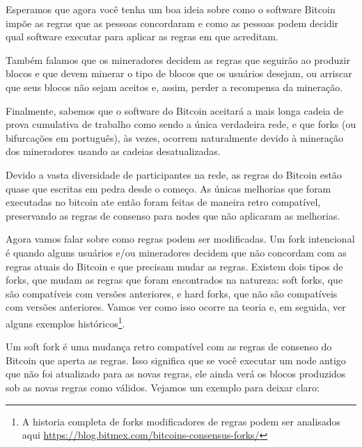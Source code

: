 
Esperamos que agora você tenha um boa ideia sobre como o software Bitcoin impõe as regras que as pessoas concordaram e como as pessoas podem decidir qual software executar para aplicar as regras em que acreditam.

Também falamos que os mineradores decidem as regras que seguirão ao produzir blocos e que devem minerar o tipo de blocos que os usuários desejam, ou arriscar que seus blocos não sejam aceitos e, assim, perder a recompensa da mineração.

Finalmente, sabemos que o software do Bitcoin aceitará a mais longa cadeia de prova cumulativa de trabalho como sendo a única verdadeira rede, e que forks (ou bifurcações em português), às vezes, ocorrem naturalmente devido à mineração dos mineradores usando as cadeias desatualizadas.

Devido a vasta diversidade de participantes na rede, as regras do Bitcoin estão quase que escritas em pedra desde o começo. As únicas melhorias que foram executadas no bitcoin ate então foram feitas de maneira retro compatível, preservando as regras de consenso para nodes que não aplicaram as melhorias.

Agora vamos falar sobre como regras podem ser modificadas.
Um fork intencional é quando alguns usuários e/ou mineradores decidem que não concordam com as regras atuais do Bitcoin e que precisam mudar as regras. 
Existem dois tipos de forks, que mudam as regras que foram encontrados na natureza: soft forks, que são compatíveis com versões anteriores, e hard forks, que não são compatíveis com versões anteriores.
Vamos ver como isso ocorre na teoria e, em seguida, ver alguns exemplos históricos\footnote{A historia completa de forks modificadores de regras podem ser analisados aqui \url{https://blog.bitmex.com/bitcoins-consensus-forks/}}.


Um soft fork é uma mudança retro compatível com as regras de consenso do Bitcoin que aperta as regras.
Isso significa que se você executar um node antigo que não foi atualizado para as novas regras, ele ainda verá os blocos produzidos sob as novas regras como válidos. 
Vejamos um exemplo para deixar claro:

